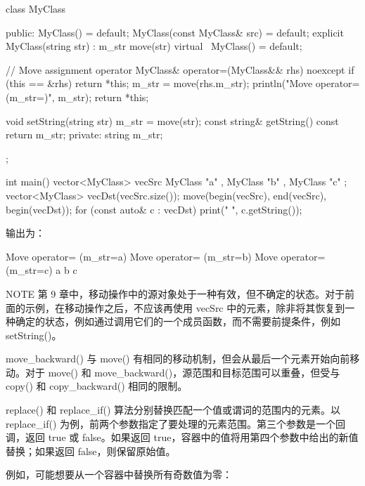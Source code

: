 \begin{cpp}
class MyClass
{
    public:
        MyClass() = default;
        MyClass(const MyClass& src) = default;
        explicit MyClass(string str) : m_str { move(str) } {}
        virtual ~MyClass() = default;

        // Move assignment operator
        MyClass& operator=(MyClass&& rhs) noexcept {
            if (this == &rhs) { return *this; }
            m_str = move(rhs.m_str);
            println("Move operator= (m_str={})", m_str);
            return *this;
        }

        void setString(string str) { m_str = move(str); }
        const string& getString() const { return m_str; }
    private:
        string m_str;
};

int main()
{
    vector<MyClass> vecSrc { MyClass { "a" }, MyClass { "b" }, MyClass { "c" } };
    vector<MyClass> vecDst(vecSrc.size());
    move(begin(vecSrc), end(vecSrc), begin(vecDst));
    for (const auto& c : vecDst) { print("{} ", c.getString()); }
}
\end{cpp}

输出为：

\begin{shell}
Move operator= (m_str=a)
Move operator= (m_str=b)
Move operator= (m_str=c)
a b c
\end{shell}

\begin{myNotic}{NOTE}
第 9 章中，移动操作中的源对象处于一种有效，但不确定的状态。对于前面的示例，在移动操作之后，不应该再使用 vecSrc 中的元素，除非将其恢复到一种确定的状态，例如通过调用它们的一个成员函数，而不需要前提条件，例如 setString()。
\end{myNotic}

move\_backward() 与 move() 有相同的移动机制，但会从最后一个元素开始向前移动。对于 move() 和 move\_backward()，源范围和目标范围可以重叠，但受与 copy() 和 copy\_backward() 相同的限制。


replace() 和 replace\_if() 算法分别替换匹配一个值或谓词的范围内的元素。以 replace\_if() 为例，前两个参数指定了要处理的元素范围。第三个参数是一个回调，返回 true 或 false。如果返回 true，容器中的值将用第四个参数中给出的新值替换；如果返回 false，则保留原始值。

例如，可能想要从一个容器中替换所有奇数值为零：


